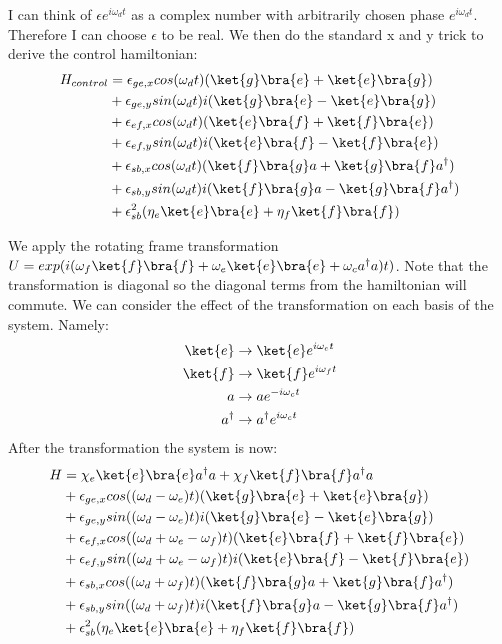 \documentclass[letterpaper, 12pt]{article}
\begin{document}
I can think of $\epsilon e^{i\omega_{d}t}$ as a complex number with arbitrarily chosen phase $e^{i\omega_{d}t}$. Therefore I can choose $\epsilon$ to be real. We then do the standard x and y trick to derive the control hamiltonian:
\begin{align*}
  H_{control} &= \epsilon_{ge, x}cos(\omega_{d}t)(\ket{g}\bra{e} + \ket{e}\bra{g})\\
  &+ \epsilon_{ge, y}sin(\omega_{d}t)i(\ket{g}\bra{e} - \ket{e}\bra{g})\\
  &+ \epsilon_{ef, x}cos(\omega_{d}t)(\ket{e}\bra{f} + \ket{f}\bra{e})\\
  &+ \epsilon_{ef, y}sin(\omega_{d}t)i(\ket{e}\bra{f} - \ket{f}\bra{e})\\
  &+ \epsilon_{sb, x}cos(\omega_{d}t)(\ket{f}\bra{g}a + \ket{g}\bra{f}a^{\dagger})\\
  &+ \epsilon_{sb, y}sin(\omega_{d}t)i(\ket{f}\bra{g}a - \ket{g}\bra{f}a^{\dagger})\\
  &+ \epsilon_{sb}^{2}(\eta_{e}\ket{e}\bra{e} + \eta_{f}\ket{f}\bra{f})\\
\end{align*}

We apply the rotating frame transformation $U = exp(i(\omega_{f}\ket{f}\bra{f} + \omega_{e}\ket{e}\bra{e} + \omega_{c}a^{\dagger}a)t)$. Note that the transformation is diagonal so the diagonal terms from the hamiltonian will commute. We can consider the effect of the transformation on each basis of the system. Namely:
\begin{align*}
  \ket{e} &\rightarrow \ket{e}e^{i\omega_{e}t}\\
  \ket{f} &\rightarrow \ket{f}e^{i\omega_{f}t}\\
  a &\rightarrow ae^{-i\omega_{c}t}\\
  a^{\dagger} &\rightarrow a^{\dagger}e^{i\omega_{c}t}\\
\end{align*}
After the transformation the system is now:
\begin{align*}
  H &= \chi_{e}\ket{e}\bra{e}a^{\dagger}a + \chi_{f}\ket{f}\bra{f}a^{\dagger}a\\
  &+ \epsilon_{ge, x}cos((\omega_{d} - \omega_{e})t)(\ket{g}\bra{e} + \ket{e}\bra{g})\\
  &+ \epsilon_{ge, y}sin((\omega_{d} - \omega_{e})t)i(\ket{g}\bra{e} - \ket{e}\bra{g})\\
  &+ \epsilon_{ef, x}cos((\omega_{d} + \omega_{e} - \omega_{f})t)(\ket{e}\bra{f} + \ket{f}\bra{e})\\
  &+ \epsilon_{ef, y}sin((\omega_{d} + \omega_{e} - \omega_{f})t)i(\ket{e}\bra{f} - \ket{f}\bra{e})\\
  &+ \epsilon_{sb, x}cos((\omega_{d} + \omega_{f})t)(\ket{f}\bra{g}a + \ket{g}\bra{f}a^{\dagger})\\
  &+ \epsilon_{sb, y}sin((\omega_{d} + \omega_{f})t)i(\ket{f}\bra{g}a - \ket{g}\bra{f}a^{\dagger})\\
  &+ \epsilon_{sb}^{2}(\eta_{e}\ket{e}\bra{e} + \eta_{f}\ket{f}\bra{f})\\
\end{align*}
\end{document}

